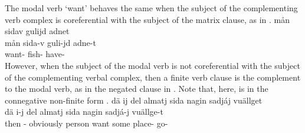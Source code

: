 The modal verb  ‘want’ behaves the same when the subject of the complementing verb complex is coreferential with the subject of the matrix clause, as in .
\ea\label{modalVerbs4}%
\glll	mån sidav gulijd adnet\\
	mån sida-v guli-jd adne-t\\
	 want- fish- have-\\\nopagebreak
{} 
\z
However, when the subject of the modal verb  is not coreferential with the subject of the complementing verbal complex, then a finite verb clause %
is the complement to the modal verb, as in the negated clause in . Note that, here,  is in the connegative non-finite form . %
\ea\label{modalVerbs5}%
\glll	dä ij del almatj sida nagin sadjáj vuällget\\
	dä i-j del almatj sida nagin sadjá-j vuällge-t\\
	then - obviously person\BS{} want\BS{} some place- go-\\\nopagebreak
{} 
\z

